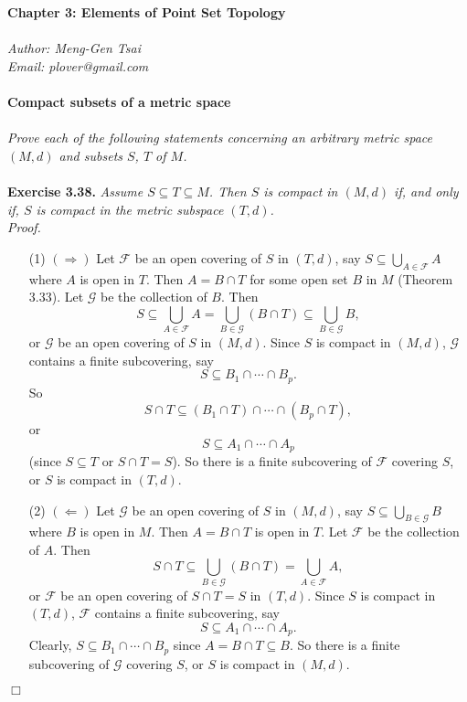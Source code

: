 \documentclass{article}
\begin{document}
\textbf{\Large Chapter 3: Elements of Point Set Topology} \\\\



\emph{Author: Meng-Gen Tsai} \\
\emph{Email: plover@gmail.com} \\\\






\textbf{\large Compact subsets of a metric space} \\\\

\emph{Prove each of the following statements concerning an arbitrary metric space
$(M,d)$ and subsets $S$, $T$ of $M$.} \\\\



\textbf{Exercise 3.38.}
\emph{Assume $S \subseteq T \subseteq M$.
Then $S$ is compact in $(M,d)$ if, and only if,
$S$ is compact in the metric subspace $(T,d)$. } \\

\emph{Proof.}
\begin{enumerate}
\item[(1)]
$(\Longrightarrow)$
Let $\mathscr{F}$ be an open covering of $S$ in $(T,d)$, say
$S \subseteq \bigcup_{A \in \mathscr{F}} A$ where $A$ is open in $T$.
Then $A = B \cap T$ for some open set $B$ in $M$ (Theorem 3.33).
Let $\mathscr{G}$ be the collection of $B$.
Then
$$S \subseteq
\bigcup_{A \in \mathscr{F}} A
= \bigcup_{B \in \mathscr{G}} (B \cap T)
\subseteq \bigcup_{B \in \mathscr{G}} B,$$
or $\mathscr{G}$ be an open covering of $S$ in $(M,d)$.
Since $S$ is compact in $(M,d)$,
$\mathscr{G}$ contains a finite subcovering, say
$$S \subseteq B_1 \cap \cdots \cap B_p.$$
So $$S \cap T \subseteq (B_1\cap T) \cap \cdots \cap (B_p \cap T),$$
or $$S \subseteq A_1 \cap \cdots \cap A_p$$ (since $S \subseteq T$ or $S \cap T = S$).
So there is a finite subcovering of $\mathscr{F}$ covering $S$,
or $S$ is compact in $(T,d)$.
\item[(2)]
$(\Longleftarrow)$
Let $\mathscr{G}$ be an open covering of $S$ in $(M,d)$, say
$S \subseteq \bigcup_{B \in \mathscr{G}} B$ where $B$ is open in $M$.
Then $A = B \cap T$ is open in $T$.
Let $\mathscr{F}$ be the collection of $A$.
Then
$$S \cap T \subseteq
\bigcup_{B \in \mathscr{G}} (B \cap T)
= \bigcup_{A \in \mathscr{F}} A,$$
or $\mathscr{F}$ be an open covering of $S \cap T = S$ in $(T,d)$.
Since $S$ is compact in $(T,d)$,
$\mathscr{F}$ contains a finite subcovering, say
$$S \subseteq A_1 \cap \cdots \cap A_p.$$
Clearly, $S \subseteq B_1 \cap \cdots \cap B_p$ since $A = B \cap T \subseteq B$.
So there is a finite subcovering of $\mathscr{G}$ covering $S$,
or $S$ is compact in $(M,d)$.
\end{enumerate}
$\Box$ \\\\
\end{document}
